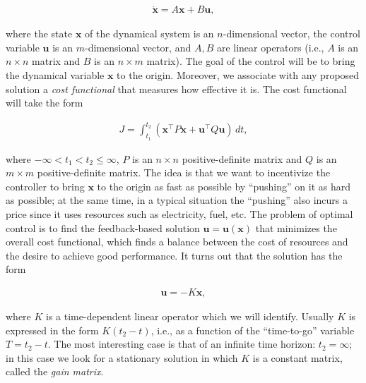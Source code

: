 \documentclass[11pt]{report}
\theoremstyle{plain}
\theoremstyle{definition}
\begin{document}
\begin{equation*} \tag{45}\label{eq:lqp-linear}
\begin{split}
\dot{\mathbf{x}} = A \mathbf{x} + B \mathbf{u},
\end{split}
\end{equation*}

\noindent where the state $\mathbf{x}$ of the dynamical system
is an $n$-dimensional vector, the control variable
$\mathbf{u}$ is an $m$-dimensional vector, and $A, B$
are linear operators (i.e., $A$ is an $n\times n$
matrix and $B$ is an $n\times m$ matrix). The goal of
the control will be to bring the dynamical variable
$\mathbf{x}$ to the origin. Moreover, we associate
with any proposed solution a \emph{cost functional} that
measures how effective it is. The cost functional will
take the form

\begin{equation*} \tag{46}\label{eq:lqp-quadratic}
\begin{split}
J = \int_{t_1}^{t_2}
\left( \mathbf{x}^\top P \mathbf{x} + \mathbf{u}^\top Q \mathbf{u} \right)\, dt,
\end{split}
\end{equation*}

\noindent where $-\infty<t_1<t_2\le \infty$, $P$ is an
$n\times n$ positive-definite matrix and $Q$ is an
$m\times m$ positive-definite matrix. The idea is that
we want to incentivize the controller to bring
$\mathbf{x}$ to the origin as fast as possible by
``pushing'' on it as hard as possible; at the same
time, in a typical situation the ``pushing'' also
incurs a price since it uses resources such as
electricity, fuel, etc. The problem of optimal control
is to find the feedback-based solution
$\mathbf{u}=\mathbf{u}(\mathbf{x})$ that minimizes the
overall cost functional, which finds a balance between
the cost of resources and the desire to achieve good
performance. It turns out that the solution has the
form

\begin{equation*} \tag{47}\label{eq:lqp-gain-mat}
\begin{split}
\mathbf{u} = -K \mathbf{x},
\end{split}
\end{equation*}

\noindent where $K$ is a time-dependent linear operator which we
will identify. Usually $K$ is expressed in the form
$K(t_2-t)$, i.e., as a function of the ``time-to-go''
variable $T=t_2-t$. The most interesting case is that
of an infinite time horizon: $t_2=\infty$; in this
case we look for a stationary solution in which $K$ is
a constant matrix, called the \emph{gain matrix}.
\end{document}
